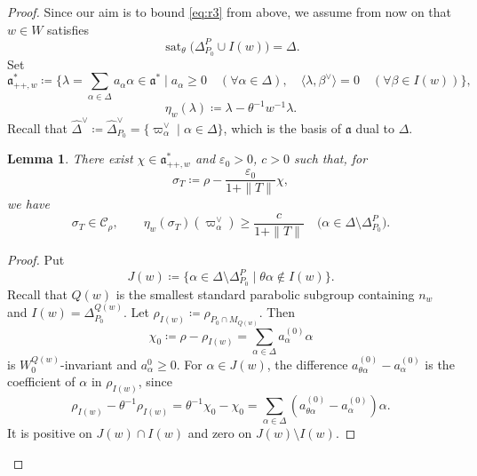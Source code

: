 \documentclass[12pt]{amsart}
\theoremstyle{definition}
\theoremstyle{plain}
\newtheorem{lemma}[definition]{Lemma}
\theoremstyle{remark}
\newcommand{\fa}{\mathfrak{a}}
\numberwithin{equation}{section}
\newcommand{\sC}{\mathscr{C}}
\begin{document}
\begin{proof}
Since our aim is to bound \eqref{eq:r3} from above, we assume from now on that $w\in W$ satisfies 
\[
\operatorname{sat}_\theta\bigl(\Delta_{P_0}^P\cup I(w)\bigr) =\Delta.
\]
Set
\[
\fa^*_{++,w}\coloneqq \{ \lambda=\sum_{\alpha\in\Delta}a_\alpha\alpha\in\fa^* \mid a_\alpha\geq0 \quad (\forall \alpha\in\Delta),\quad \langle\lambda,\beta^\vee\rangle=0 \quad (\forall \beta\in I(w))\},
\]
\[
 \eta_w(\lambda)\coloneqq \lambda-\theta^{-1}w^{-1}\lambda.
\]
Recall that $\widehat\Delta^\vee\coloneqq \widehat\Delta^\vee_{P_0}=\{ \varpi_\alpha^\vee \mid \alpha\in\Delta \}$, which is the basis of $\fa$ dual to $\Delta$.
\begin{lemma}
\label{lem:th45-parameter}
There exist $\chi\in\fa^*_{++,w}$ and $\varepsilon_0>0$, $c>0$ such that, for
\begin{equation}\label{eq:th45-parameter}
 \sigma_T\coloneqq \rho-\frac{\varepsilon_0}{1+\|T\|}\chi,
\end{equation}
we have
\begin{equation}\label{eq:th45-parameter-properties}
 \sigma_T\in\sC_\rho,
 \qquad
 \eta_w(\sigma_T)(\varpi_\alpha^\vee)\geq\frac{c}{1+\|T\|}
 \quad\bigl(\alpha\in\Delta\setminus\Delta_{P_0}^P\bigr).
\end{equation}
\end{lemma}
\begin{proof}
Put 
\[
 J(w)\coloneqq \{\alpha\in\Delta\setminus\Delta_{P_0}^P\mid 
                         \theta\alpha\notin I(w)\}.
\]
Recall that $Q(w)$ is the smallest standard parabolic subgroup containing $n_w$ and $I(w)=\Delta_{P_0}^{Q(w)}$.
Let $\rho_{I(w)}\coloneqq \rho_{P_0\cap M_{Q(w)}}$.
Then 
\[
\chi_0\coloneqq \rho-\rho_{I(w)}=\sum_{\alpha\in\Delta}a_\alpha^{(0)}\alpha
\]
is $W_0^{Q(w)}$-invariant and $a_\alpha^0\ge0$.
For $\alpha\in J(w)$, the difference
$a_{\theta\alpha}^{(0)}-a_\alpha^{(0)}$ is the coefficient of $\alpha$ in $\rho_{I(w)}$, since
\[
\rho_{I(w)}-\theta^{-1}\rho_{I(w)}=\theta^{-1}\chi_0-\chi_0=\sum_{\alpha\in\Delta}(a_{\theta\alpha}^{(0)}-a^{(0)}_\alpha)\alpha.
\]
It is positive on $J(w)\cap I(w)$ and zero on $J(w)\setminus I(w)$.


\end{proof}
\end{proof}
\end{document}
